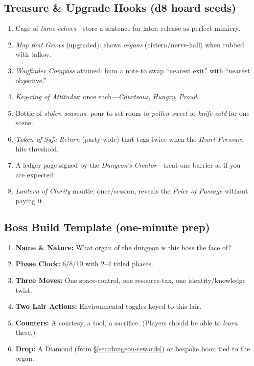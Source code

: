 \subsection*{Treasure \& Upgrade Hooks (d8 hoard seeds)}
\label{sec:dungeon-loot}
\begin{enumerate}
  \item Cage of \emph{tame echoes}—store a sentence for later; release as perfect mimicry.
  \item \emph{Map that Grows} (upgraded): shows \emph{organs} (cistern/nerve-hall) when rubbed with tallow.
  \item \emph{Wayfinder Compass} attuned: hum a note to swap “nearest exit” with “nearest objective.”
  \item \emph{Key-ring of Attitudes}: once each—\emph{Courteous}, \emph{Hungry}, \emph{Proud}.
  \item Bottle of \emph{stolen seasons}: pour to set room to \emph{pollen-sweet} or \emph{knife-cold} for one scene.
  \item \emph{Token of Safe Return} (party-wide) that tugs twice when the \emph{Heart Pressure} hits threshold.
  \item A ledger page signed by the \emph{Dungeon’s Creator}—treat one barrier as if you are expected.
  \item \emph{Lantern of Clarity} mantle: once/session, reveals the \emph{Price of Passage} without paying it.
\end{enumerate}

\subsection*{Boss Build Template (one-minute prep)}
\label{sec:dungeon-boss-template}
\begin{enumerate}
  \item \textbf{Name \& Nature:} What organ of the dungeon is this boss the face of?
  \item \textbf{Phase Clock:} 6/8/10 with 2–4 titled phases.
  \item \textbf{Three Moves:} One space-control, one resource-tax, one identity/knowledge twist.
  \item \textbf{Two Lair Actions:} Environmental toggles keyed to this lair.
  \item \textbf{Counters:} A courtesy, a tool, a sacrifice. (Players should be able to \emph{learn} these.)
  \item \textbf{Drop:} A Diamond (from \S\ref{sec:dungeon-rewards}) or bespoke boon tied to the organ.
\end{enumerate}

